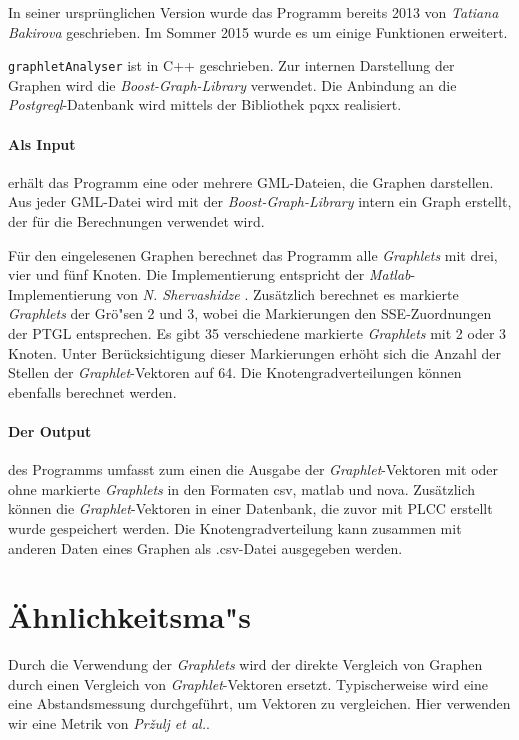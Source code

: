 \documentclass{report}
\begin{document}
In seiner urspr\"unglichen Version wurde das Programm bereits 2013 von \textit{Tatiana Bakirova} geschrieben. Im Sommer 2015 wurde es um einige Funktionen erweitert.

\texttt{graphletAnalyser} ist in C++ geschrieben. Zur internen Darstellung der Graphen wird die \textit{Boost-Graph-Library} verwendet. Die Anbindung an die \textit{Postgreql}-Datenbank wird mittels der Bibliothek pqxx realisiert.

\paragraph{Als Input} erh\"alt das Programm eine oder mehrere GML-Dateien, die Graphen darstellen. Aus jeder GML-Datei wird mit der \textit{Boost-Graph-Library} intern ein Graph erstellt, der f\"ur die Berechnungen verwendet wird.

F\"ur den eingelesenen Graphen berechnet das Programm alle \textit{Graphlets} mit drei, vier und f\"unf Knoten. Die Implementierung entspricht der \textit{Matlab}-Implementierung von \textit{N. Shervashidze} \cite{sherv_graphlets}. Zus\"atzlich berechnet es markierte \textit{Graphlets} der Gr\"o"sen 2 und 3, wobei die Markierungen den SSE-Zuordnungen der PTGL entsprechen. Es gibt 35 verschiedene markierte \textit{Graphlets} mit 2 oder 3 Knoten. Unter Ber\"ucksichtigung dieser Markierungen erh\"oht sich die Anzahl der Stellen der \textit{Graphlet}-Vektoren auf 64.
Die Knotengradverteilungen k\"onnen ebenfalls berechnet werden.

\paragraph{Der Output} des Programms umfasst zum einen die Ausgabe der \textit{Graphlet}-Vektoren mit oder ohne markierte \textit{Graphlets} in den Formaten csv, matlab und nova. Zus\"atzlich k\"onnen die \textit{Graphlet}-Vektoren in einer Datenbank, die zuvor mit PLCC erstellt wurde gespeichert werden. Die Knotengradverteilung kann zusammen mit anderen Daten eines Graphen als .csv-Datei ausgegeben werden.


\section{\"Ahnlichkeitsma"s}

Durch die Verwendung der \textit{Graphlets} wird der direkte Vergleich von Graphen durch einen Vergleich von \textit{Graphlet}-Vektoren ersetzt. Typischerweise wird eine eine Abstandsmessung durchgef\"uhrt, um Vektoren zu vergleichen. Hier verwenden wir eine Metrik von \textit{Pr\v{z}ulj et al.}.
\end{document}
